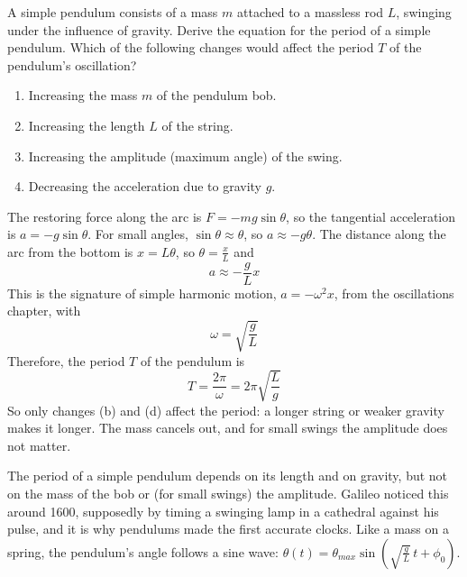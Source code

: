 \begin{Exercise}
	[label={ex:pendulumperiod}, title={Pendulum Period Dependence}] A simple
	pendulum consists of a mass $m$ attached to a massless rod $L $, swinging under the
	influence of gravity. Derive the equation for the period of a simple pendulum. Which
	of the following changes would affect the period $T$ of the pendulum's oscillation?
	\begin{enumerate}[]
		\item Increasing the mass $m$ of the pendulum bob.

		\item Increasing the length $L$ of the string.

		\item Increasing the amplitude (maximum angle) of the swing.

		\item Decreasing the acceleration due to gravity $g $.
	\end{enumerate}
\end{Exercise}
\begin{Answer}
	[ref={ex:pendulumperiod}] The restoring force along the arc is $F = -mg\sin\theta$, so the
	tangential acceleration is $a = -g\sin\theta$. For small angles,
	$\sin\theta \approx \theta$, so $a \approx -g\theta$. The distance along
	the arc from the bottom is $x = L\theta$, so $\theta = \frac{x}{L}$ and
	\begin{equation}
		a \approx -\frac{g}{L}x \label{eq:linearpendulum}
	\end{equation}
	This is the signature of simple harmonic motion, $a = -\omega^2 x$, from
	the oscillations chapter, with
	\begin{equation}
		\omega = \sqrt{\frac{g}{L}}
	\end{equation}
	Therefore, the period $T$ of the pendulum is
	\begin{equation}
		T = \frac{2\pi}{\omega} = 2\pi \sqrt{\frac{L}{g}}
	\end{equation}
	So only changes (b) and (d) affect the period: a longer string or weaker
	gravity makes it longer. The mass cancels out, and for small swings the
	amplitude does not matter.
\end{Answer}
The period of a simple pendulum depends on its length and on gravity,
but not on the mass of the bob or (for small swings) the amplitude. Galileo
noticed this around 1600, supposedly by timing a swinging lamp in a
cathedral against his pulse, and it is why pendulums made the first
accurate clocks. Like a mass on a spring, the pendulum's angle follows a
sine wave: $\theta(t) = \theta_{max}\sin\left(\sqrt{\frac{g}{L}}\,t + \phi_{0}\right)$.

